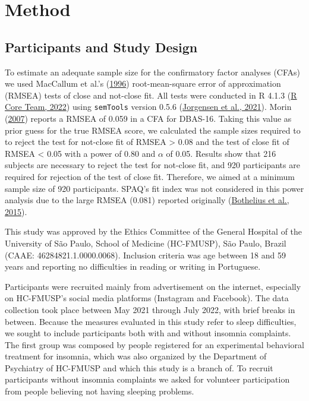 \documentclass[
  ,doc,11pt, twoside,floatsintext]{apa6}
\begin{document}
\newpage

\hypertarget{method}{%
\section{Method}\label{method}}

\hypertarget{participants-and-study-design}{%
\subsection{Participants and Study Design}\label{participants-and-study-design}}

To estimate an adequate sample size for the confirmatory factor analyses (CFAs) we used MacCallum et al.'s (\protect\hyperlink{ref-maccallum1996}{1996}) root-mean-square error of approximation (RMSEA) tests of close and not-close fit. All tests were conducted in R 4.1.3 (\protect\hyperlink{ref-R-base}{R Core Team, 2022}) using \texttt{semTools} version 0.5.6 (\protect\hyperlink{ref-semtools}{Jorgensen et al., 2021}). Morin (\protect\hyperlink{ref-morin2007a}{2007}) reports a RMSEA of 0.059 in a CFA for DBAS-16. Taking this value as prior guess for the true RMSEA score, we calculated the sample sizes required to to reject the test for not-close fit of RMSEA \textgreater{} 0.08 and the test of close fit of RMSEA \textless{} 0.05 with a power of 0.80 and \(\alpha\) of 0.05. Results show that 216 subjects are necessary to reject the test for not-close fit, and 920 participants are required for rejection of the test of close fit. Therefore, we aimed at a minimum sample size of 920 participants. SPAQ's fit index was not considered in this power analysis due to the large RMSEA (0.081) reported originally (\protect\hyperlink{ref-bothelius2015}{Bothelius et al., 2015}).

This study was approved by the Ethics Committee of the General Hospital of the University of São Paulo, School of Medicine (HC-FMUSP), São Paulo, Brazil (CAAE: 46284821.1.0000.0068). Inclusion criteria was age between 18 and 59 years and reporting no difficulties in reading or writing in Portuguese.

Participants were recruited mainly from advertisement on the internet, especially on HC-FMUSP's social media platforms (Instagram and Facebook). The data collection took place between May 2021 through July 2022, with brief breaks in between. Because the measures evaluated in this study refer to sleep difficulties, we sought to include participants both with and without insomnia complaints. The first group was composed by people registered for an experimental behavioral treatment for insomnia, which was also organized by the Department of Psychiatry of HC-FMUSP and which this study is a branch of. To recruit participants without insomnia complaints we asked for volunteer participation from people believing not having sleeping problems.
\end{document}
